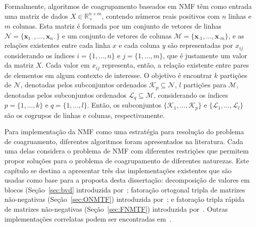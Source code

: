 \documentclass[
    12pt,                %
    oneside,            %
    a4paper,            %
    english,            %
    brazil                %
    ]{abntex2ppgsi}
\begin{document}
Formalmente, algoritmos de coagrupamento baseados em NMF têm como entrada uma matriz de dados $X \in \mathbb{R}^{n \times m}_{+}$, contendo números reais positivos com $n$ linhas e $m$ colunas.
Esta matriz é formada por um conjunto de vetores de linhas $\mathcal{N} = \{ \mathbf{x}_{1 \cdot}, \dots, \mathbf{x}_{n \cdot} \}$ e um conjunto de vetores de colunas $\mathcal{M} = \{ \mathbf{x}_{\cdot 1}, \dots, \mathbf{x}_{\cdot m} \}$, e as relações existentes entre cada linha $x$ e cada coluna $y$ são representadas por $x_{ij}$ considerando os índices $i = \{1, \dots, n\}$ e $j = \{1, \dots, m\}$, que é justamente um valor da matriz $X$.
Cada valor em $x_{ij}$ representa, então, a relação existente entre pares de elementos em algum contexto de interesse.
O objetivo é encontrar $k$ partições de $\mathcal{N}$, denotadas pelos subconjuntos ordenados $\mathcal{K}_p \subseteq \mathcal{N}$, $l$ partições para $\mathcal{M}$, denotadas pelos subconjuntos ordenados $\mathcal{L}_q \subseteq \mathcal{M}$, considerando os índices $p = \{ 1, \dots, k\}$ e $q = \{1, \dots, l\}$.
Então, os subconjuntos $\{\mathcal{K}_1, \dots, \mathcal{K}_p\}$ e $\{\mathcal{L}_1, \dots, \mathcal{L}_l\}$ são os cogrupos de linhas e colunas, respectivamente.



Para implementação da NMF como uma estratégia para resolução do problema de coagruamento, diferentes algoritmos foram apresentados na literatura.
Cada uma delas considera o problema de NMF com diferentes restrições que permitem propor soluções para o problema de coagrupamento de diferentes naturezas.
Este capítulo se destina a apresentar três das implementações existentes que são usadas como base para a proposta desta dissertação: decomposição de valores em blocos (Seção~\ref{sec:bvd} introduzida por~; fatoração ortogonal tripla de matrizes não-negativas (Seção~\ref{sec:ONMTF}) introduzida por~; e fatoração tripla rápida de matrizes não-negativas (Seção~\ref{sec:FNMTF}) introduzida por~.
Outras implementações correlatas podem ser encontradas em~\cite{Li2006}.
\end{document}
